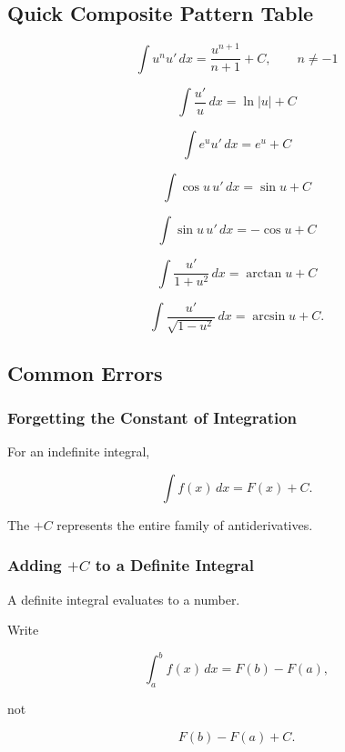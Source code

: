 \subsection{Quick Composite Pattern Table}
\label{subsec:quick-composite-integral-patterns}

\[
\boxed{
\int
u^n u'\,dx
=
\frac{
u^{n+1}
}{
n+1
}
+C,
\qquad
n\neq-1
}
\]

\[
\boxed{
\int
\frac{u'}{u}
\,dx
=
\ln|u|+C
}
\]

\[
\boxed{
\int
e^u u'\,dx
=
e^u+C
}
\]

\[
\boxed{
\int
\cos u\,u'\,dx
=
\sin u+C
}
\]

\[
\boxed{
\int
\sin u\,u'\,dx
=
-\cos u+C
}
\]

\[
\boxed{
\int
\frac{
u'
}{
1+u^2
}
\,dx
=
\arctan u+C
}
\]

\[
\boxed{
\int
\frac{
u'
}{
\sqrt{1-u^2}
}
\,dx
=
\arcsin u+C.
}
\]

\subsection{Common Errors}
\label{subsec:integral-tables-common-errors}

\subsubsection{Forgetting the Constant of Integration}

For an indefinite integral,

\[
\boxed{
\int f(x)\,dx
=
F(x)+C.
}
\]

The \(+C\) represents the entire family of antiderivatives.

\subsubsection{Adding \(+C\) to a Definite Integral}

A definite integral evaluates to a number.

Write

\[
\boxed{
\int_a^b
f(x)\,dx
=
F(b)-F(a),
}
\]

not

\[
F(b)-F(a)+C.
\]

